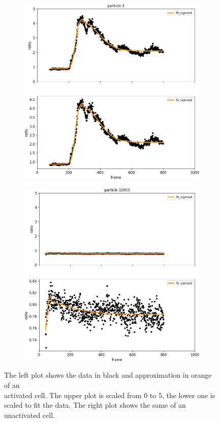 \begin{figure}[h]
	\centering
	\begin{subfigure}{0.48\linewidth}
		\includegraphics[width=\textwidth]{fig/particle_vis_sigmoid_approx_pos}
	\end{subfigure}
	\hfill
	\begin{subfigure}{0.48\linewidth}
		\includegraphics[width=\textwidth]{fig/particle_vis_sigmoid_approx_neg}
	\end{subfigure}
	
	\caption{The left plot shows the data in black and approximation in orange of an\\ activated cell. The upper plot is scaled from 0 to 5, the lower one is scaled to fit the data. The right plot shows the same of an unactivated cell.}
	\label{fig:particle_vis_sigmoid_approx}
\end{figure}



